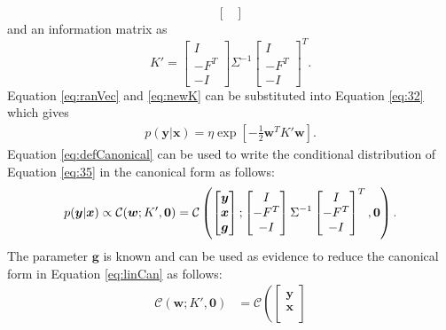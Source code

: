\documentclass[12pt,oneside,openany,a4paper, %
afrikaans,english,
]{memoir}
\numberwithin{equation}{chapter}
\begin{document}
{\begin{equation}
\begin{bmatrix}
\end{bmatrix}
\end{equation}
and an information matrix as
\begin{equation}\label{eq:newK}
K' =
\begin{bmatrix}
I\\-F^T\\-I
\end{bmatrix}
\Sigma^{-1}
\begin{bmatrix}
I\\-F^T\\-I
\end{bmatrix}^T.
\end{equation}
Equation \ref{eq:ranVec} and \ref{eq:newK} can be substituted into Equation \ref{eq:32} which gives
\begin{equation}
\label{eq:35}
\begin{split}
p(\bm{y}|\bm{x}) = \eta\exp\left[-\frac{1}{2}
\bm{w}^T
K'
\bm{w}
\right].
\end{split}
\end{equation}
Equation \ref{eq:defCanonical} can be used to write the conditional distribution of Equation \ref{eq:35} in the canonical form as follows:
\begin{equation}\label{eq:linCan}
p(\bm{y}|\bm{x}) \propto \mathcal{C}(\bm{w}; K', \bm{0})\\
 =\mathcal{C}\left(
\begin{bmatrix}
\bm{y} \\
\bm{x} \\
\bm{g}
\end{bmatrix};
\begin{bmatrix}
I\\
-F^T\\
-I
\end{bmatrix}
\Sigma^{-1}
\begin{bmatrix}
I\\
-F^T\\
-I
\end{bmatrix}^T
, \bm{0}
\right).
\end{equation}
The parameter $\bm{g}$ is known and can be used as evidence to reduce the canonical form in Equation \ref{eq:linCan} as follows:
\begin{equation}\label{eq:conCanResult}
\begin{split}
\mathcal{C}(\bm{w}; K', \bm{0})& =\mathcal{C}\left(
\begin{bmatrix}
\bm{y} \\
\bm{x} \\

\end{bmatrix}
\end{split}
\end{equation}}
\end{document}
